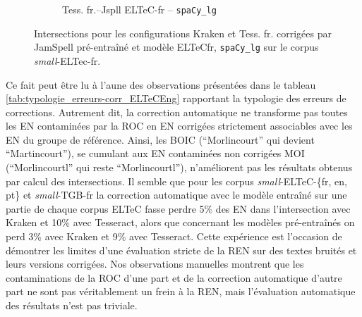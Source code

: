 \begin{figure}[h!]
\begin{minipage}{6.5cm}
\begin{subfigure}{0.8\textwidth}
  \caption{Tess. fr.--Jspll ELTeC-fr -- \texttt{spaCy\_lg}}
  \label{fig:ELTeCFRA_Tess -- jspl-ELTeCFR_spacy-lg-concat_intersection}
  \end{subfigure}
    \end{minipage}
\caption{Intersections pour les configurations Kraken et Tess. fr. corrigées par JamSpell pré-entraîné et modèle ELTeCfr, \texttt{spaCy\_lg} sur le corpus \textit{small}-ELTec-fr.}
\label{fig:intersection_globale-kraken}
\end{figure}

Ce fait peut être lu à l'aune des observations présentées dans le tableau \ref{tab:typologie_erreurs-corr_ELTeCEng} rapportant la typologie des erreurs de corrections. Autrement dit, la correction automatique ne transforme pas toutes les EN contaminées par la ROC en EN corrigées strictement associables avec les EN du groupe de référence. Ainsi, les BOIC (``Morlincourt'' qui devient ``Martincourt''), se cumulant aux EN contaminées non corrigées MOI (``Morlincourtl'' qui reste ``Morlincourtl''), n'améliorent pas les résultats obtenus par calcul des intersections. Il semble que pour les corpus \textit{small}-ELTeC-\{fr, en, pt\} et \textit{small}-TGB-fr la correction automatique avec le modèle entraîné sur une partie de chaque corpus ELTeC fasse perdre 5\% des EN dans l'intersection avec Kraken et 10\% avec Tesseract, alors que concernant les modèles pré-entraînés on perd 3\% avec Kraken et 9\% avec Tesseract. Cette expérience est l'occasion de démontrer les limites d'une évaluation stricte de la REN sur des textes bruités et leurs versions corrigées. Nos observations manuelles montrent que les contaminations de la ROC d'une part et de la correction automatique d'autre part ne sont pas véritablement un frein à la REN, mais l'évaluation automatique des résultats n'est pas triviale.


